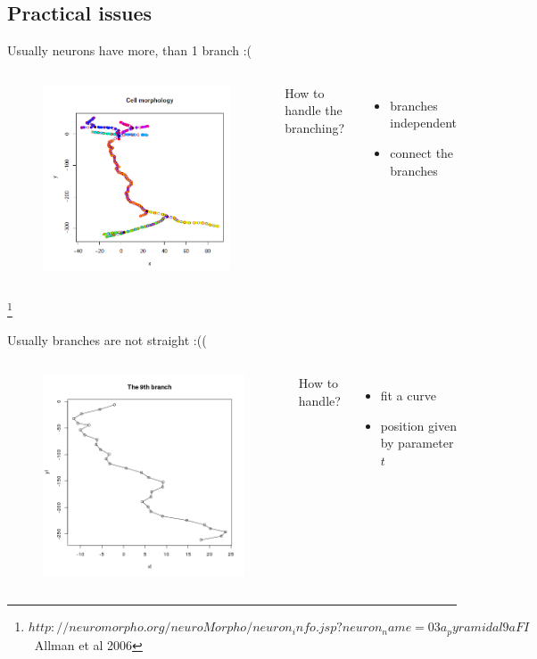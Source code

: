 \documentclass[11pt,a4paper,titlepage]{beamer}
\begin{document}
\subsection{Practical issues}

\begin{frame}{Usually neurons have more, than 1 branch :(}
\begin{columns}
\begin{figure}
\includegraphics[height=6 cm]{plots/cellmorph.png}
\end{figure}
How to handle the branching?
\begin{itemize}
\item branches independent
\item connect the branches
\end{itemize}
\end{columns}
\footnote{$http://neuromorpho.org/neuroMorpho/neuron_info.jsp?
neuron_name=03a_pyramidal9aFI$ \
Allman et al 2006}
\end{frame}


\begin{frame}{Usually branches are not straight :((}
\begin{columns}
\begin{figure}
\includegraphics[height=6 cm]{plots/9thbranch.png}
\end{figure}
How to handle?
\begin{itemize}
\item fit a curve
\item position given by parameter $t$
\end{itemize}
\end{columns}
\end{frame}
\end{document}
